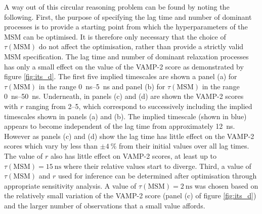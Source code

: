 A way out of this circular reasoning problem can be found by noting the following. First, the purpose of specifying the lag time and number of dominant processes is to provide a starting point from which the hyperparameters of the MSM can be optimised. It is therefore only necessary that the choice of $\tau(\mathrm{MSM})$ do not affect the optimisation, rather than provide a strictly valid MSM specification. The lag time and number of dominant relaxation processes has only a small effect on the value of the VAMP-2 score as demonstrated by figure \ref{fig:its_d}. The first five implied timescales are shown a panel (a)  for $\tau(\mathrm{MSM})$ in the range \SIrange{0}{5}{\nano\second} and panel (b) for $\tau(\mathrm{MSM})$ in the range \SIrange{0}{50}{\nano\second}. Underneath, in panels (c) and (d) are shown the VAMP-2 scores with $r$ ranging from \numrange{2}{5}, which correspond to successively including the implied timescales shown in panels (a) and (b). The implied timescale (shown in blue) appears to become independent of the lag time from approximately \SI{12}{\nano\second}. However as panels (c) and (d) show the lag time has little effect on the VAMP-2 scores which vary by less than $\pm\SI{4}{\percent}$ from their initial values over all lag times. The value of $r$ also has little effect on VAMP-2 scores, at least up to $\tau(\mathrm{MSM})=\SI{15}{\nano\second}$ where their relative values start to diverge. Third, a value of $\tau(\mathrm{MSM})$ and $r$ used for inference can be determined after optimisation through appropriate sensitivity analysis. A value of $\tau(\mathrm{MSM})=\SI{2}{\nano\second}$ was chosen based on the relatively small variation of the VAMP-2 score (panel (c) of figure \ref{fig:its_d}) and the larger number of observations that a small value affords. 

